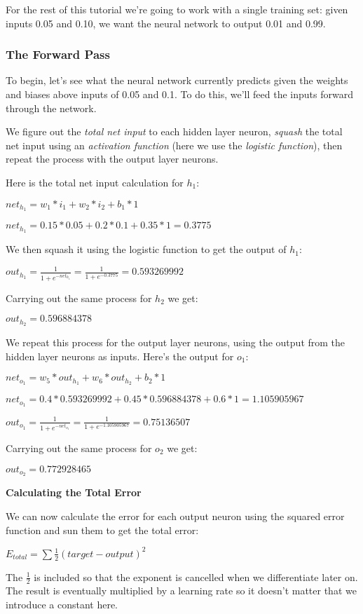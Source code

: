 \documentclass[a4paper]{article}
\begin{document}
For the rest of this tutorial we’re going to work with a single training set: given inputs 0.05 and 0.10, we want the neural network to output 0.01 and 0.99.

\subsubsection{The Forward Pass}
To begin, let's see what the neural network currently predicts given the weights and biases above inputs of 0.05 and 0.1. To do this, we'll feed the inputs forward through the network.

We figure out the \textit{total net input} to each hidden layer neuron, \textit{squash }the total net input using an \textit{activation function }(here we use the \textit{logistic function}), then repeat the process with the output layer neurons.

Here is the total net input calculation for $h_1$:

$net_{h_1}=w_1*i_1+w_2*i_2+b_1*1$ 

$net_{h_1}=0.15*0.05+0.2*0.1+0.35*1=0.3775$ 

We then squash it using the logistic function to get the output of ${h_1}$:

$out_{h_1} = \frac{1}{1+e^{-net_{h_1}}}=\frac{1}{1+e^{-0.3775}}=0.593269992$ 

Carrying out the same process for $h_2$ we get:

$out_{h_2}=0.596884378$

\bigskip
We repeat this process for the output layer neurons, using the output from the hidden layer neurons as inputs. Here's the output for $o_1$:

$net_{o_1}=w_5*out_{h_1}+w_6*out_{h_2}+b_2*1$

$net_{o_1}=0.4*0.593269992+0.45*0.596884378+0.6*1=1.105905967$

$out_{o_1}=\frac{1}{1+e^{-net_{o_1}}}=\frac{1}{1+e^{-1.105905967}}=0.75136507$

Carrying out the same process for $o_2$ we get:

$out_{o_2}=0.772928465$

\bigskip
\textbf{Calculating the Total Error}

We can now calculate the error for each output neuron using the squared error function and sun them to get the total error:

$E_{total}=\sum\frac{1}{2}(target-output)^2$

The $\frac{1}{2}$ is included so that the exponent is cancelled when we differentiate later on. The result is eventually multiplied by a learning rate so it doesn't matter that we introduce a constant here.
\end{document}
